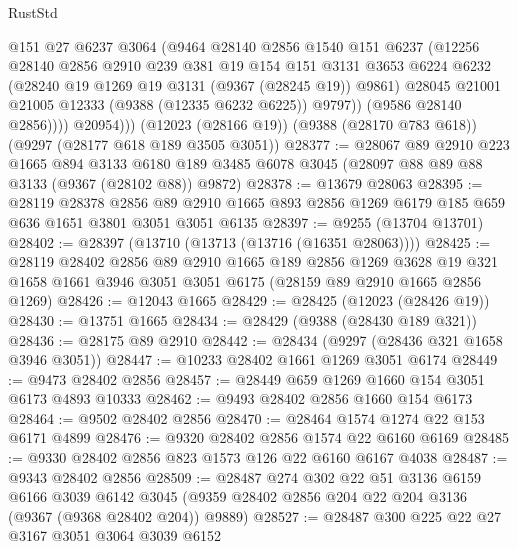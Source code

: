 \begin{lexlean}{RustStd}
\begin{coremodule}
                @151
                @27
                @6237
                @3064
                (@9464
                  @28140
                  @2856
                  @1540
                  @151
                  @6237
                  (@12256
                    @28140
                    @2856
                    @2910
                    @239
                    @381
                    @19
                    @154
                    @151
                    @3131
                    @3653
                    @6224
                    @6232
                    (@28240 @19 @1269 @19 @3131 (@9367 (@28245 @19)) @9861)
                    @28045
                    @21001
                    @21005
                    @12333
                    (@9388 (@12335 @6232 @6225))
                    @9797))
                (@9586 @28140 @2856))))
          @20954)))
    (@12023 (@28166 @19))
    (@9388 (@28170 @783 @618))
    (@9297 (@28177 @618 @189 @3505 @3051))
@28377 := @28067
    @89
    @2910
    @223
    @1665
    @894
    @3133
    @6180
    @189
    @3485
    @6078
    @3045
    (@28097 @88 @89 @88 @3133 (@9367 (@28102 @88)) @9872)
@28378 := @13679 @28063
@28395 := @28119
    @28378
    @2856
    @89
    @2910
    @1665
    @893
    @2856
    @1269
    @6179
    @185
    @659
    @636
    @1651
    @3801
    @3051
    @3051
    @6135
@28397 := @9255 (@13704 @13701)
@28402 := @28397 (@13710 (@13713 (@13716 (@16351 @28063))))
@28425 := @28119
    @28402
    @2856
    @89
    @2910
    @1665
    @189
    @2856
    @1269
    @3628
    @19
    @321
    @1658
    @1661
    @3946
    @3051
    @3051
    @6175
    (@28159 @89 @2910 @1665 @2856 @1269)
@28426 := @12043 @1665
@28429 := @28425 (@12023 (@28426 @19))
@28430 := @13751 @1665
@28434 := @28429 (@9388 (@28430 @189 @321))
@28436 := @28175 @89 @2910
@28442 := @28434 (@9297 (@28436 @321 @1658 @3946 @3051))
@28447 := @10233 @28402 @1661 @1269 @3051 @6174
@28449 := @9473 @28402 @2856
@28457 := @28449 @659 @1269 @1660 @154 @3051 @6173 @4893 @10333
@28462 := @9493 @28402 @2856 @1660 @154 @6173
@28464 := @9502 @28402 @2856
@28470 := @28464 @1574 @1274 @22 @153 @6171 @4899
@28476 := @9320 @28402 @2856 @1574 @22 @6160 @6169
@28485 := @9330 @28402 @2856 @823 @1573 @126 @22 @6160 @6167 @4038
@28487 := @9343 @28402 @2856
@28509 := @28487
    @274
    @302
    @22
    @51
    @3136
    @6159
    @6166
    @3039
    @6142
    @3045
    (@9359 @28402 @2856 @204 @22 @204 @3136 (@9367 (@9368 @28402 @204)) @9889)
@28527 := @28487
    @300
    @225
    @22
    @27
    @3167
    @3051
    @3064
    @3039
    @6152

\end{coremodule}
\end{lexlean}
